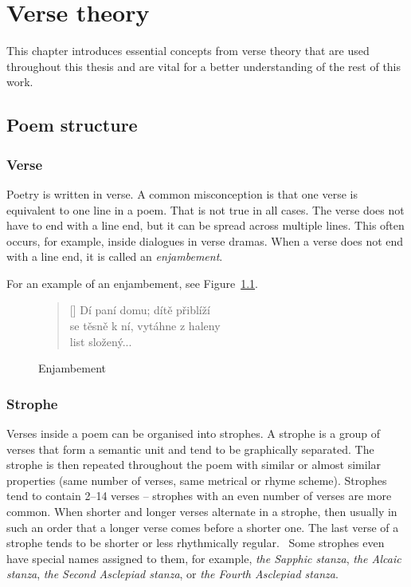 \chapter{Verse theory}\label{chap:verse-theory}

\begin{chapterabstract}
This chapter introduces essential concepts from verse theory that are used throughout this thesis and are vital for a better understanding of the rest of this work.
\end{chapterabstract}

\section{Poem structure}

\subsection{Verse}
Poetry is written in verse. A common misconception is that one verse is equivalent to one line in a poem. That is not true in all cases. The verse does not have to end with a line end, but it can be spread across multiple lines. This often occurs, for example, inside dialogues in verse dramas. When a verse does not end with a line end, it is called an \emph{enjambement}.~\cite{TeorieLiteraturySS}

For an example of an enjambement, see Figure~\ref{fig:enjambement}.

\begin{figure}[htpb]
    \centering
    \settowidth{\versewidth}{se těsně k ní, vytáhne z haleny}
    \begin{verse}[\versewidth]
    Dí paní domu; dítě přiblíží\\
    se těsně k ní, vytáhne z haleny\\
    list složený...
    \end{verse}
    \caption[Enjambement]{Enjambement~\cite{UvodTeorieVerse}}\label{fig:enjambement}
\end{figure}

\subsection{Strophe}
Verses inside a poem can be organised into strophes. A strophe is a group of verses that form a semantic unit and tend to be graphically separated. The strophe is then repeated throughout the poem with similar or almost similar properties (same number of verses, same metrical or rhyme scheme). Strophes tend to contain 2--14 verses -- strophes with an even number of verses are more common. When shorter and longer verses alternate in a strophe, then usually in such an order that a longer verse comes before a shorter one. The last verse of a strophe tends to be shorter or less rhythmically regular.~\cite{TeorieLiteraturySS} Some strophes even have special names assigned to them, for example, \emph{the Sapphic stanza}, \emph{the Alcaic stanza}, \emph{the Second Asclepiad stanza}, or \emph{the Fourth Asclepiad stanza}.~\cite{UvodTeorieVerse}

